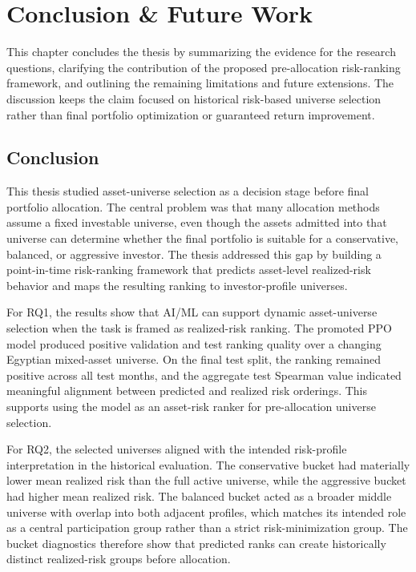 \chapter{Conclusion \& Future Work}
\label{chap:concl}

This chapter concludes the thesis by summarizing the evidence for the research questions, clarifying the contribution of the proposed pre-allocation risk-ranking framework, and outlining the remaining limitations and future extensions. The discussion keeps the claim focused on historical risk-based universe selection rather than final portfolio optimization or guaranteed return improvement.

\section{Conclusion}
\label{sec:conclusion}

This thesis studied asset-universe selection as a decision stage before final portfolio allocation. The central problem was that many allocation methods assume a fixed investable universe, even though the assets admitted into that universe can determine whether the final portfolio is suitable for a conservative, balanced, or aggressive investor. The thesis addressed this gap by building a point-in-time risk-ranking framework that predicts asset-level realized-risk behavior and maps the resulting ranking to investor-profile universes.

For RQ1, the results show that AI/ML can support dynamic asset-universe selection when the task is framed as realized-risk ranking. The promoted PPO model produced positive validation and test ranking quality over a changing Egyptian mixed-asset universe. On the final test split, the ranking remained positive across all test months, and the aggregate test Spearman value indicated meaningful alignment between predicted and realized risk orderings. This supports using the model as an asset-risk ranker for pre-allocation universe selection.

For RQ2, the selected universes aligned with the intended risk-profile interpretation in the historical evaluation. The conservative bucket had materially lower mean realized risk than the full active universe, while the aggressive bucket had higher mean realized risk. The balanced bucket acted as a broader middle universe with overlap into both adjacent profiles, which matches its intended role as a central participation group rather than a strict risk-minimization group. The bucket diagnostics therefore show that predicted ranks can create historically distinct realized-risk groups before allocation.

